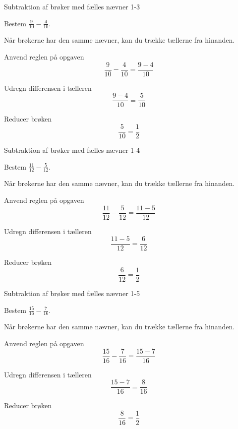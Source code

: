 \documentclass{article}
\begin{document}
\begin{exercise}{Subtraktion af brøker med fælles nævner 1-3}

Bestem $\frac{9}{10} - \frac{4}{10}$.


\hint

Når brøkerne har den samme nævner, kan du trække tællerne fra hinanden.

\hint

Anvend reglen på opgaven
\[
\frac{9}{10} - \frac{4}{10} = \frac{9 - 4}{10}
\]

\hint

Udregn differensen i tælleren
\[
\frac{9 - 4}{10} = \frac{5}{10}
\]

\hint

Reducer brøken
\[
\frac{5}{10} = \frac{1}{2}
\]

\end{exercise}

\newpage

\begin{exercise}{Subtraktion af brøker med fælles nævner 1-4}

Bestem $\frac{11}{12} - \frac{5}{12}$.


\hint

Når brøkerne har den samme nævner, kan du trække tællerne fra hinanden.

\hint

Anvend reglen på opgaven
\[
\frac{11}{12} - \frac{5}{12} = \frac{11 - 5}{12}
\]

\hint

Udregn differensen i tælleren
\[
\frac{11 - 5}{12} = \frac{6}{12}
\]

\hint

Reducer brøken
\[
\frac{6}{12} = \frac{1}{2}
\]

\end{exercise}

\newpage

\begin{exercise}{Subtraktion af brøker med fælles nævner 1-5}

Bestem $\frac{15}{16} - \frac{7}{16}$.


\hint

Når brøkerne har den samme nævner, kan du trække tællerne fra hinanden.

\hint

Anvend reglen på opgaven
\[
\frac{15}{16} - \frac{7}{16} = \frac{15 - 7}{16}
\]

\hint

Udregn differensen i tælleren
\[
\frac{15 - 7}{16} = \frac{8}{16}
\]

\hint

Reducer brøken
\[
\frac{8}{16} = \frac{1}{2}
\]

\end{exercise}
\end{document}
